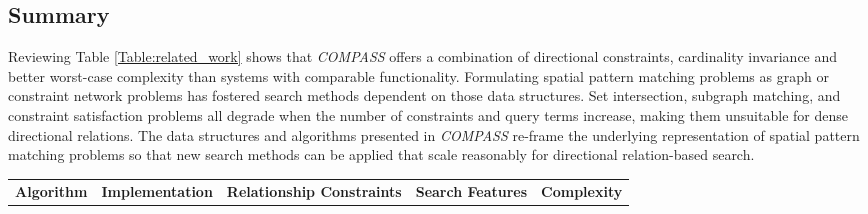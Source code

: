 {{\subsection{Summary}

\par{
    Reviewing Table \ref{Table:related_work} shows that \emph{COMPASS} offers a combination of directional constraints, cardinality invariance and better worst-case complexity than systems with comparable functionality.
    Formulating spatial pattern matching problems as graph or constraint network problems has fostered search methods dependent on those data structures. 
    Set intersection, subgraph matching, and constraint satisfaction problems all degrade when the number of constraints and query terms increase, making them unsuitable for dense directional relations. 
    The data structures and algorithms presented in \emph{COMPASS} re-frame the underlying representation of spatial pattern matching problems so that new search methods can be applied that scale reasonably for directional relation-based search.
}

\setlength\tabcolsep{0pt}
\small{
\begin{table*}[h!]
    \begin{center}
        \begin{tabular}{|c|ccc|cccc|ccc|c|} 

        

            \hline
            \multicolumn{1}{|c|}{\multirow{2}{*}{\textbf{Algorithm}}}& 
            \multicolumn{3}{|c|}{\multirow{2}{*}{\textbf{Implementation}}} &
            \multicolumn{4}{|c|}{\multirow{2}{*}{\textbf{Relationship Constraints}}} &
            \multicolumn{3}{|c|}{\multirow{2}{*}{\textbf{Search Features}}} &
            \multicolumn{1}{|c|}{\multirow{2}{*}{\textbf{Complexity}}} \\
            &&&&&&&&&&& \\
        

\end{tabular}
\end{center}
\end{table*}}}}

